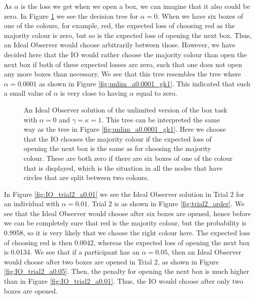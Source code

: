 As $\alpha$ is the loss we get when we open a box, we can imagine that it also could be zero. In Figure \ref{fig:unlim_a0_gk1} we see the decision tree for $\alpha=0$. When we have six boxes of one of the colours, for example, red, the expected loss of choosing red as the majority colour is zero, but so is the expected loss of opening the next box. Thus, an Ideal Observer would choose arbitrarily between those. However, we have decided here that the IO would rather choose the majority colour than open the next box if both of these expected losses are zero, such that one does not open any more boxes than necessary. We see that this tree resembles the tree where $\alpha=0.0001$ as shown in Figure \ref{fig:unlim_a0.0001_gk1}. This indicated that such a small value of $\alpha$ is very close to having $\alpha$ equal to zero. 
\begin{figure}
    \centering
    \scalebox{0.5}{}
    \caption[IO solution, unlimited. $\alpha=0$, $\gamma=\kappa=1$]{An Ideal Observer solution of the unlimited version of the box task with $\alpha = 0$ and $\gamma=\kappa=1$. This tree can be interpreted the same way as the tree in Figure \ref{fig:unlim_a0.0001_gk1}.  Here we choose that the IO chooses the majority colour if the expected loss of opening the next box is the same as for choosing the majority colour. These are both zero if there are six boxes of one of the colour that is displayed, which is the situation in all the nodes that have circles that are split between two colours.}
    \label{fig:unlim_a0_gk1}
\end{figure}

In Figure \ref{fig:IO_trial2_a0.01} we see the Ideal Observer solution in Trial 2 for an individual with $\alpha=0.01$. Trial 2 is as shown in Figure \ref{fig:trial2_order}. We see that the Ideal Observer would choose after six boxes are opened, hence before we can be completely sure that red is the majority colour, but the probability is 0.9958, so it is very likely that we choose the right colour here. The expected loss of choosing red is then 0.0042, whereas the expected loss of opening the next box is 0.0134.
We see that if a participant has an $\alpha=0.05$, then an Ideal Observer would choose after two boxes are opened in Trial 2, as shown in Figure \ref{fig:IO_trial2_a0.05}. 
Then, the penalty for opening the next box is much higher than in Figure \ref{fig:IO_trial2_a0.01}. Thus, the IO would choose after only two boxes are opened. 

